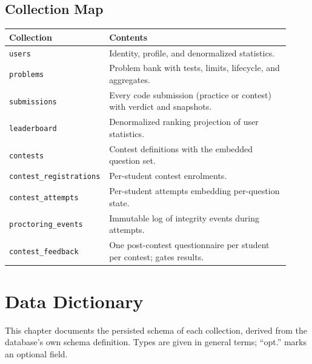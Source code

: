 \documentclass[12pt,a4paper,oneside]{report}
\newcommand{\code}[1]{\texttt{#1}}
\begin{document}
\section{Collection Map}
\begin{longtable}{@{}p{0.28\linewidth} p{0.64\linewidth}@{}}
\toprule
\textbf{Collection} & \textbf{Contents}\\
\midrule
\endhead
\code{users} & Identity, profile, and denormalized statistics.\\
\code{problems} & Problem bank with tests, limits, lifecycle, and aggregates.\\
\code{submissions} & Every code submission (practice or contest) with verdict and snapshots.\\
\code{leaderboard} & Denormalized ranking projection of user statistics.\\
\code{contests} & Contest definitions with the embedded question set.\\
\code{contest\_registrations} & Per-student contest enrolments.\\
\code{contest\_attempts} & Per-student attempts embedding per-question state.\\
\code{proctoring\_events} & Immutable log of integrity events during attempts.\\
\code{contest\_feedback} & One post-contest questionnaire per student per contest; gates results.\\
\bottomrule
\end{longtable}

\chapter{Data Dictionary}
This chapter documents the persisted schema of each collection, derived from the
database's own schema definition. Types are given in general terms; ``opt.''
marks an optional field.
\end{document}
